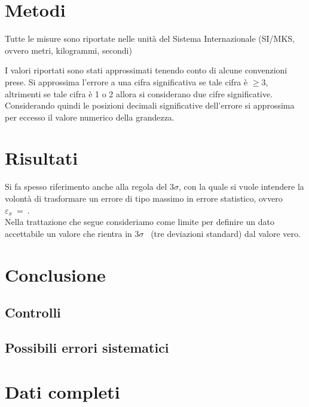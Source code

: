 \documentclass[italian, a4paper, 10pt, twocolumn]{../../style/lab_unige}
\newcommand{\treSigma}{$3\sigma$}
\newcommand{\mstdErr}[1]{\varepsilon_{#1}}
\begin{document}
    \section{Metodi}
    \label{section:methods}
    Tutte le misure sono riportate nelle unità del Sistema Internazionale (SI/MKS, ovvero metri, kilogrammi, secondi)
    
    I valori riportati sono stati approssimati tenendo conto di alcune convenzioni prese. Si approssima l'errore a una cifra significativa se tale cifra è $\geqslant3$, altrimenti se tale cifra è 1 o 2 allora si considerano due cifre significative. Considerando quindi le posizioni decimali significative dell'errore si approssima per eccesso il valore numerico della grandezza.

    \section{Risultati}
    \label{section:results}
    Si fa spesso riferimento anche alla regola del \treSigma, con la quale si vuole intendere la volontà di trasformare un errore di tipo massimo in errore statistico, ovvero $\mstdErr{x}~=~$.\\%
    Nella trattazione che segue consideriamo come limite per definire un dato accettabile un valore che rientra in \treSigma~ (tre deviazioni standard) dal valore vero.

    
    \section{Conclusione}
    \label{section:conclusion}

    \subsection{Controlli}

    \subsection{Possibili errori sistematici}

    \appendix

    \setcounter{table}{0}
    \renewcommand{\thetable}{A\arabic{table}}

    \section{Dati completi}
    
    
\end{document}
